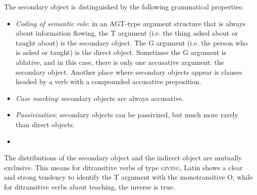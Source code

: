 \documentclass[a4paper, oneside, 12pt]{report}
\newcommand{\classify}[1]{{\textsc{#1}}}
\begin{document}
The secondary object is distinguished by the following grammatical properties:
\begin{itemize}
    \item \emph{Coding of semantic role}: in an AGT-type argument structure
    that is always about information flowing,
    the T argument (i.e. the thing asked about or taught about) is the secondary object.
    The G argument (i.e. the person who is asked or taught) is the direct object.
    Sometimes the G argument is ablative, and in this case, 
    there is only one accusative argument: the secondary object.
    Another place where secondary objects appear is 
    clauses headed by a verb with a compounded accusative preposition. %
    \item \emph{Case marking}: secondary objects are always accusative.
    \item \emph{Passivization}: secondary objects can be passivized, but much more rarely than direct objects.
    \item %
\end{itemize}

The distributions of the secondary object and the indirect object 
are mutually exclusive.
This means for ditransitive verbs of type \classify{giving}, 
Latin shows a clear and strong tendency to identify the T argument with the monotransitive O,
while for ditransitive verbs about teaching,
the inverse is true.
\end{document}
